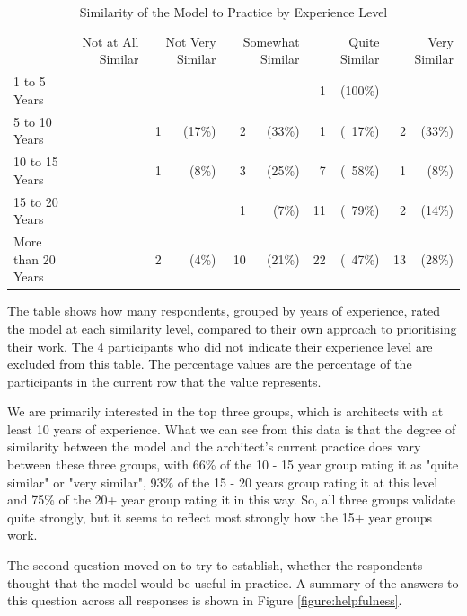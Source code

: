 \begin{table}
\caption{Similarity of the Model to Practice by Experience Level}
\label{table:similaritybyexp}
\footnotesize
\begin{tabular}{l rrrrrrrrrr}
                & \multicolumn{2}{P{1.5cm}}{Not at All Similar} & \multicolumn{2}{P{1.5cm}}{Not Very Similar} & \multicolumn{2}{P{1.5cm}}{Somewhat Similar} & \multicolumn{2}{P{1.5cm}}{Quite Similar} & \multicolumn{2}{P{1.5cm}}{Very Similar} \\
1 to 5 Years       && &   &        &    &       & 1  & (100\%) &	&        \\
5 to 10 Years      && & 1 & (17\%) & 2  &(33\%) & 1  & (~17\%) & 2  & (33\%) \\
10 to 15 Years     && & 1 & (8\%)  & 3  &(25\%) & 7  & (~58\%) & 1  & (8\%)  \\
15 to 20 Years     && &   &        & 1  &(7\%)  & 11 & (~79\%) & 2  & (14\%) \\
More than 20 Years && & 2 & (4\%)  & 10 &(21\%) & 22 & (~47\%) & 13 & (28\%) \\
\end{tabular}
\end{table}

The table shows how many respondents, grouped by years of experience, rated the model at each similarity level, compared to their own approach to prioritising their work.  The 4 participants who did not indicate their experience level are excluded from this table.  The percentage values are the percentage of the participants in the current row that the value represents.

We are primarily interested in the top three groups, which is architects with at least 10 years of experience.  What we can see from this data is that the degree of similarity between the model and the architect's current practice does vary between these three groups, with 66\% of the 10 - 15 year group rating it as "quite similar" or "very similar", 93\% of the 15 - 20 years group rating it at this level and 75\% of the 20+ year group rating it in this way.  So, all three groups validate quite strongly, but it seems to reflect most strongly how the 15+ year groups work.

The second question moved on to try to establish, whether the respondents thought that the model would be useful in practice.  A summary of the answers to this question across all responses is shown in Figure \ref{figure:helpfulness}.
 
